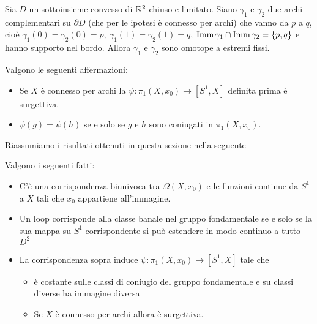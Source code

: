 \begin{multicols*}{2}
\begin{lemma}\label{CamminiComplementariSuBordoConvesso}
Sia $D$ un sottoinsieme convesso di $\mathbb{R}^2$ chiuso e limitato. Siano $\gamma_1$ e $\gamma_2$ due archi complementari su $\partial D$ (che per le ipotesi è connesso per archi) che vanno da $p$ a $q$, cioè $\gamma_1(0)=\gamma_2(0)=p,\ \gamma_1(1)=\gamma_2(1)=q$, $\mathrm{Imm}\, \gamma_1\cap \mathrm{Imm}\,\gamma_2=\{p,q\}$ e hanno supporto nel bordo. Allora $\gamma_1$ e $\gamma_2$ sono omotope a estremi fissi.
\end{lemma}

\begin{theorem}
Valgono le seguenti affermazioni:
\begin{itemize}[noitemsep]
\item Se $X$ è connesso per archi la $\psi:\pi_1(X,x_0)\to[S^1,X]$ definita prima è surgettiva.
\item $\psi(g)=\psi(h)$ se e solo se $g$ e $h$ sono coniugati in $\pi_1(X,x_0)$.
\end{itemize}
\end{theorem}

\noindent Riassumiamo i risultati ottenuti in questa sezione nella seguente
\begin{proposition}\label{CorrispondenzaTraOmotopieDiCamminiTraLoopEOmotopieLibereDiMappeDefiniteSullaSfere}
Valgono i seguenti fatti:
\begin{itemize}[noitemsep]
\item C'è una corrispondenza biunivoca tra $\Omega(X,x_0)$ e le funzioni continue da $S^1$ a $X$ tali che $x_0$ appartiene all'immagine.
\item Un loop corrisponde alla classe banale nel gruppo fondamentale se e solo se la sua mappa su $S^1$ corrispondente si può estendere in modo continuo a tutto $D^2$
\item La corrispondenza sopra induce $\psi:\pi_1(X,x_0)\to[S^1,X]$ tale che
\begin{itemize}[noitemsep]
\item è costante sulle classi di coniugio del gruppo fondamentale e su classi diverse ha immagine diversa
\item Se $X$ è connesso per archi allora è surgettiva.
\end{itemize}
\end{itemize}
\end{proposition}


\end{multicols*}
